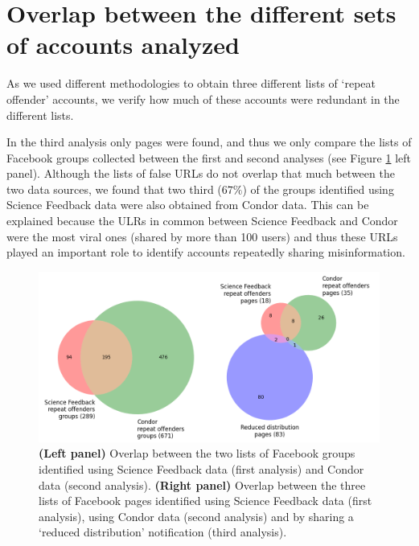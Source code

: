 \documentclass[review]{elsarticle}
\begin{document}
{\section*{Overlap between the different sets of accounts analyzed}

As we used different methodologies to obtain three different lists of `repeat offender' accounts, we verify how much of these accounts were redundant in the different lists. 

In the third analysis only pages were found, and thus we only compare the lists of Facebook groups collected between the first and second analyses (see Figure \ref{venn_accounts} left panel). 
Although the lists of false URLs do not overlap that much between the two data sources, we found that two third ($67\%$) of the groups identified using Science Feedback data were also obtained from Condor data. 
This can be explained because the ULRs in common between Science Feedback and Condor were the most viral ones (shared by more than 100 users) and thus these URLs played an important role to identify accounts repeatedly sharing misinformation.

\begin{figure}[!h]
\centering
\includegraphics[scale=0.5]{./../figure/supplementary_venn_groups_and_pages.png}
\caption{
\textbf{(Left panel)} Overlap between the two lists of Facebook groups identified using Science Feedback data (first analysis) and Condor data (second analysis). \textbf{(Right panel)} Overlap between the three lists of Facebook pages identified using Science Feedback data (first analysis), using Condor data (second analysis) and by sharing a `reduced distribution' notification (third analysis).
}
\label{venn_accounts}
\end{figure}

}
\end{document}
